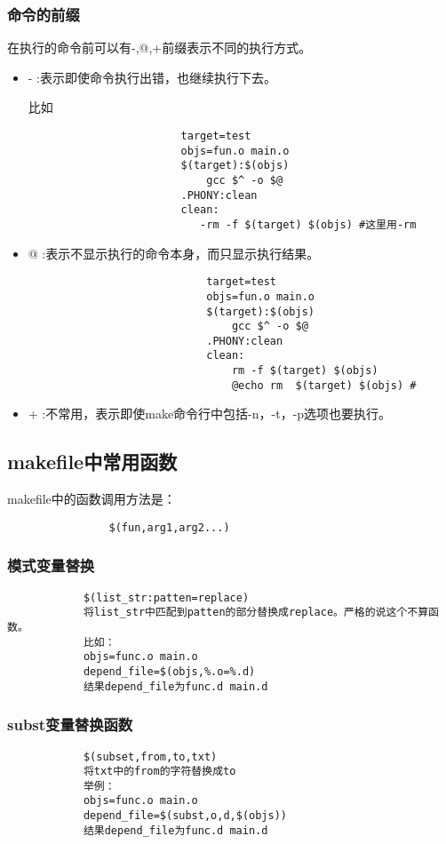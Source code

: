 \documentclass{article}
\begin{document}
\begin{CJK}{UTF8}{gbsn}
	\subsubsection{命令的前缀}
		在执行的命令前可以有-,@,+前缀表示不同的执行方式。
		\begin{itemize}
				\item - :表示即使命令执行出错，也继续执行下去。
					\par 比如
					\begin{verbatim}
						target=test
						objs=fun.o main.o
						$(target):$(objs)
						    gcc $^ -o $@
						.PHONY:clean
						clean:
						   -rm -f $(target) $(objs) #这里用-rm
					\end{verbatim}		
				\item @ :表示不显示执行的命令本身，而只显示执行结果。
					\begin{verbatim}
							target=test
							objs=fun.o main.o
							$(target):$(objs)
							    gcc $^ -o $@
							.PHONY:clean
							clean:
							    rm -f $(target) $(objs)
							    @echo rm  $(target) $(objs) #
					\end{verbatim}				
				\item + :不常用，表示即使make命令行中包括-n，-t，-p选项也要执行。
		\end{itemize}

	\subsection{makefile中常用函数}	
		makefile中的函数调用方法是：
			\begin{verbatim}
				$(fun,arg1,arg2...)
			\end{verbatim}
		\subsubsection{模式变量替换}
		\begin{verbatim}
			$(list_str:patten=replace)
			将list_str中匹配到patten的部分替换成replace。严格的说这个不算函数。
			比如：
			objs=func.o main.o
			depend_file=$(objs,%.o=%.d)
			结果depend_file为func.d main.d
		\end{verbatim}
		\subsubsection{subst变量替换函数}
		\begin{verbatim}
			$(subset,from,to,txt)
			将txt中的from的字符替换成to
			举例：
			objs=func.o main.o
			depend_file=$(subst,o,d,$(objs))
			结果depend_file为func.d main.d
		\end{verbatim}

\end{CJK}
\end{document}
